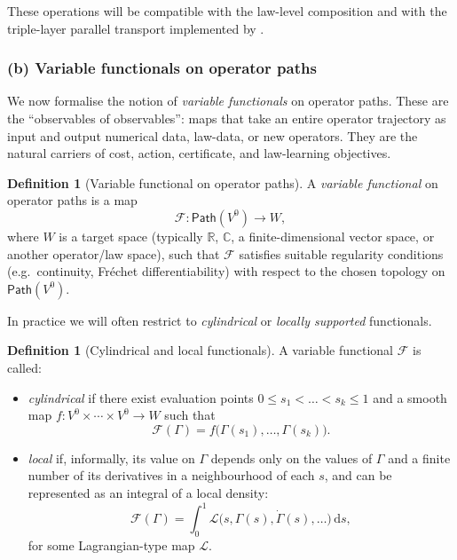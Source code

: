 \documentclass[11pt]{book}
\theoremstyle{plain}
\theoremstyle{definition}
\newtheorem{definition}[theorem]{Definition} \theoremstyle{remark}
\begin{document}
These operations will be compatible with the law-level composition and
with the triple-layer parallel transport implemented by \GZTLC.

\subsubsection*{(b) Variable functionals on operator paths}

We now formalise the notion of \emph{variable functionals} on operator
paths. These are the “observables of observables”: maps that take an
entire operator trajectory as input and output numerical data, law-data,
or new operators. They are the natural carriers of cost, action,
certificate, and law-learning objectives.

\begin{definition}[Variable functional on operator paths]
A \emph{variable functional} on operator paths is a map
  \[
     \mathcal{F}:\mathsf{Path}(V^0)\longrightarrow W,
  \]
  where $W$ is a target space (typically $\mathbb{R}$, $\mathbb{C}$,
  a finite-dimensional vector space, or another operator/law space),
  such that $\mathcal{F}$ satisfies suitable regularity conditions
  (e.g.\ continuity, Fréchet differentiability) with respect to the
  chosen topology on $\mathsf{Path}(V^0)$.
\end{definition}

In practice we will often restrict to \emph{cylindrical} or
\emph{locally supported} functionals.

\begin{definition}[Cylindrical and local functionals]
A variable functional $\mathcal{F}$ is called:
  \begin{itemize}
    \item \emph{cylindrical} if there exist evaluation points
          $0\le s_1<\dots<s_k\le1$ and a smooth map
          $f:V^0\times\cdots\times V^0\to W$ such that
          \[
             \mathcal{F}(\Gamma)
             =
             f\bigl(\Gamma(s_1),\dots,\Gamma(s_k)\bigr).
          \]
    \item \emph{local} if, informally, its value on $\Gamma$ depends
          only on the values of $\Gamma$ and a finite number of its
          derivatives in a neighbourhood of each $s$, and can be
          represented as an integral of a local density:
          \[
             \mathcal{F}(\Gamma)
             =
             \int_0^1 \mathcal{L}\bigl(s,\Gamma(s),
                                      \dot{\Gamma}(s),\dots\bigr)
                     \,\mathrm{d}s,
          \]
          for some Lagrangian-type map $\mathcal{L}$.
  \end{itemize}
\end{definition}
\end{document}
